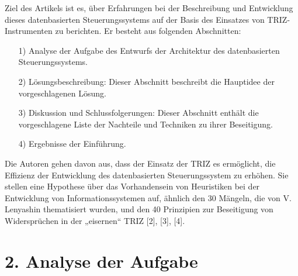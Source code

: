 \documentclass[11pt,a4paper]{article}
\begin{document}
Ziel des Artikels ist es, über Erfahrungen bei der Beschreibung und
Entwicklung dieses datenbasierten Steuerungssystems auf der Basis des
Einsatzes von TRIZ-Instrumenten zu berichten. Er besteht aus folgenden
Abschnitten:
\begin{enumerate}
\item[1)] Analyse der Aufgabe des Entwurfs der Architektur des datenbasierten
  Steuerungssystems.
\item[2)] Lösungsbeschreibung: Dieser Abschnitt beschreibt die Hauptidee der
  vorgeschlagenen Lösung.
\item[3)] Diskussion und Schlussfolgerungen: Dieser Abschnitt enthält die
  vorgeschlagene Liste der Nachteile und Techniken zu ihrer Beseitigung.
\item[4)] Ergebnisse der Einführung.
\end{enumerate}
Die Autoren gehen davon aus, dass der Einsatz der TRIZ es ermöglicht, die
Effizienz der Entwicklung des datenbasierten Steuerungssystem zu erhöhen. Sie
stellen eine Hypothese über das Vorhandensein von Heuristiken bei der
Entwicklung von Informationssystemen auf, ähnlich den 30 Mängeln, die von
V. Lenyashin thematisiert wurden, und den 40 Prinzipien zur Beseitigung von
Widersprüchen in der „eisernen“ TRIZ [2], [3], [4].

\section*{2. Analyse der Aufgabe}
\end{document}

